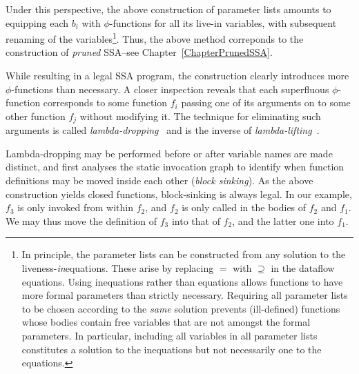 Under this perspective, the above construction of parameter lists
amounts to equipping each $b_i$ with $\phi$-functions for all its
live-in variables, with subsequent renaming of the
variables\footnote{In principle, the parameter lists can be
constructed from any solution to the
liveness-\emph{in}equations. These arise by replacing $=$ with
$\supseteq$ in the dataflow equations. Using inequations rather than
equations allows functions to have more formal parameters than
strictly necessary. Requiring all parameter lists to be chosen
according to the
\emph{same} solution prevents (ill-defined) functions whose bodies contain free
variables that are not amongst the formal parameters.  In particular,
including all variables in all parameter lists constitutes a solution
to the inequations but not necessarily one to the equations.}. Thus,
the above method correponds to the construction of \emph{pruned}
SSA--see Chapter~\ref{ChapterPrunedSSA}.

While resulting in a legal SSA program, the construction clearly
introduces more $\phi$-functions than necessary. A closer inspection
reveals that each superfluous $\phi$-function corresponds to some
function $f_i$ passing one of its arguments on to some other function
$f_j$ without modifying it. The technique for eliminating such
arguments is called
\emph{lambda-dropping}~\cite{DBLP:journals/tcs/DanvyS00} and is the inverse of
\emph{lambda-lifting}~\cite{DBLP:conf/fpca/Johnsson85}.

Lambda-dropping may be performed before or after variable names are
made distinct, and first analyses the static invocation graph to
identify when function definitions may be moved inside each other
(\emph{block sinking}). As the above construction yields closed
functions, block-sinking is always legal. In our example, $f_3$ is
only invoked from within $f_2$, and $f_2$ is only called in the bodies
of $f_2$ and $f_1$.  We may thus move the definition of $f_3$ into
that of $f_2$, and the latter one into $f_1$.


